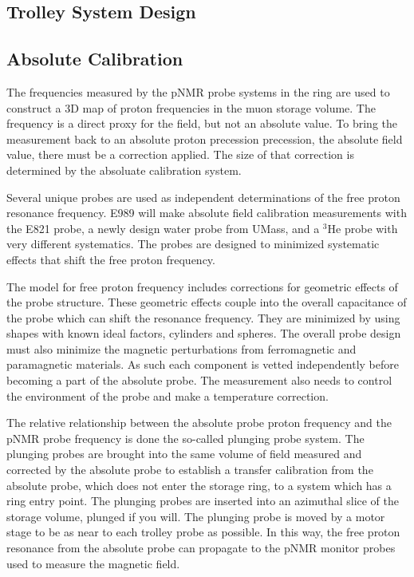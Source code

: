 
\subsection{Trolley System Design}


\subsection{Absolute Calibration}

The frequencies measured by the pNMR probe systems in the ring are used to construct a 3D map of proton frequencies in the muon storage volume.  The frequency is a direct proxy for the field, but not an absolute value.  To bring the measurement back to an absolute proton precession precession, the absolute field value, there must be a correction applied.  The size of that correction is determined by the absoluate calibration system.

Several unique probes are used as independent determinations of the free proton resonance frequency.  E989 will make absolute field calibration measurements with the E821 probe, a newly design water probe from UMass, and a $\mathrm{^3He}$ probe with very different systematics. The probes are designed to minimized systematic effects that shift the free proton frequency.  


The model for free proton frequency includes corrections for geometric effects of the probe structure.  These geometric effects couple into the overall capacitance of the probe which can shift the resonance frequency.  They are minimized by using shapes with known ideal factors, cylinders and spheres.  The overall probe design must also minimize the magnetic perturbations from ferromagnetic and paramagnetic materials.  As such each component is vetted independently before becoming a part of the absolute probe.  The measurement also needs to control the environment of the probe and make a temperature correction.


The relative relationship between the absolute probe proton frequency and the pNMR probe frequency is done the so-called plunging probe system.  The plunging probes are brought into the same volume of field measured and corrected by the absolute probe to establish a transfer calibration from the absolute probe, which does not enter the storage ring, to a system which has a ring entry point.  The plunging probes are inserted into an azimuthal slice of the storage volume, plunged if you will.  The plunging probe is moved by a motor stage to be as near to each trolley probe as possible.  In this way, the free proton resonance from the absolute probe can propagate to the pNMR monitor probes used to measure the \gmtwo magnetic field.

